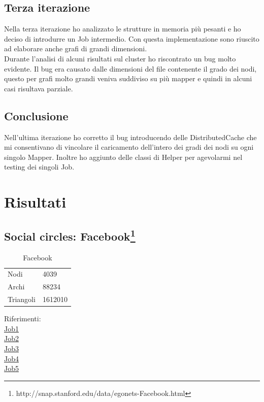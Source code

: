 \documentclass[paper=a4, fontsize=11pt]{scrartcl}	%
\numberwithin{equation}{section}															%
\numberwithin{figure}{section}																%
\numberwithin{table}{section}																%
\begin{document}
\subsection{Terza iterazione} 
Nella terza iterazione ho analizzato le strutture in memoria più pesanti e ho deciso di introdurre un Job intermedio. Con questa implementazione sono riuscito ad elaborare anche grafi di grandi dimensioni.\\ Durante l'analisi di alcuni risultati sul cluster ho riscontrato un bug molto evidente. Il bug era causato dalle dimensioni del file contenente il grado dei nodi, questo per grafi molto grandi veniva suddiviso su più mapper e quindi in alcuni casi risultava parziale.
\subsection{Conclusione} 
Nell'ultima iterazione ho corretto il bug introducendo delle DistributedCache che mi consentivano di vincolare il caricamento dell'intero dei gradi dei nodi su ogni singolo Mapper. Inoltre ho aggiunto delle classi di Helper per agevolarmi nel testing dei singoli Job.
\section{Risultati}
\subsection{Social circles: Facebook\protect\footnote{http://snap.stanford.edu/data/egonets-Facebook.html}} 
\begin{table}[]
	\centering
	\caption{Facebook}
	\label{my-label}
	\begin{tabular}{ll}
		Nodi		 & 4039 \\
		Archi		 & 88234 \\
		Triangoli	& 1612010 \\
	\end{tabular}
\end{table}
Riferimenti:\\	
\href{http://hadoop-compute0.di.univr.it:50030/jobdetails.jsp?jobid=job_201603141010_12271}{Job1}\\
\href{http://hadoop-compute0.di.univr.it:50030/jobdetails.jsp?jobid=job_201603141010_12272}{Job2}\\
\href{http://hadoop-compute0.di.univr.it:50030/jobdetails.jsp?jobid=job_201603141010_12273}{Job3}\\
\href{http://hadoop-compute0.di.univr.it:50030/jobdetails.jsp?jobid=job_201603141010_12274}{Job4}\\
\href{http://hadoop-compute0.di.univr.it:50030/jobdetails.jsp?jobid=job_201603141010_12275}{Job5}\\
\end{document}
